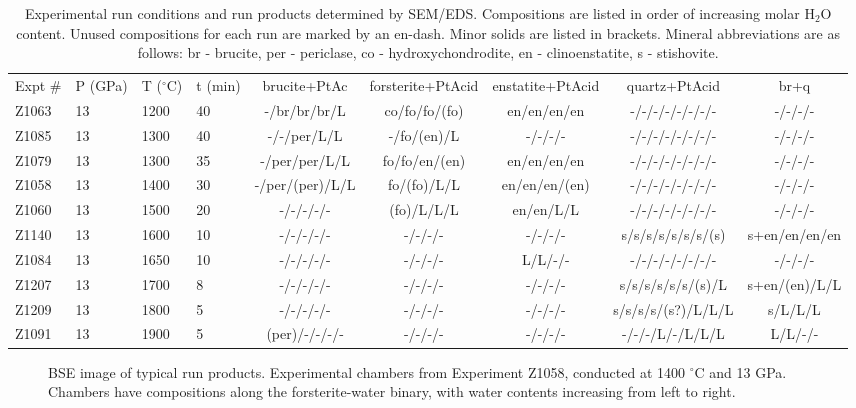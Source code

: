 \documentclass[review]{elsarticle}
\begin{document}
\begin{landscape}
\begin{table}[ht!]
\caption{Experimental run conditions and run products determined by SEM/EDS. Compositions are listed in order of increasing molar H$_2$O content. Unused compositions for each run are marked by an en-dash. Minor solids are listed in brackets. Mineral abbreviations are as follows: br - brucite, per - periclase, co - hydroxychondrodite, en - clinoenstatite, s - stishovite.}
\label{table:experiments}
\begin{tabular}{llllccccc}
Expt \# & P (GPa) & T ($^{\circ}$C) & t (min) & brucite+PtAc & forsterite+PtAcid & enstatite+PtAcid & quartz+PtAcid & br+q \\
Z1063 & 13 & 1200 & 40 & -/br/br/br/L & co/fo/fo/(fo) & en/en/en/en & -/-/-/-/-/-/-/- & -/-/-/- \\
Z1085 & 13 & 1300 & 40 & -/-/per/L/L & -/fo/(en)/L & -/-/-/- & -/-/-/-/-/-/-/- & -/-/-/- \\
Z1079 & 13 & 1300 & 35 & -/per/per/L/L & fo/fo/en/(en) & en/en/en/en & -/-/-/-/-/-/-/- & -/-/-/- \\
Z1058 & 13 & 1400 & 30 & -/per/(per)/L/L & fo/(fo)/L/L & en/en/en/(en) & -/-/-/-/-/-/-/- & -/-/-/- \\
Z1060 & 13 & 1500 & 20 & -/-/-/-/- & (fo)/L/L/L & en/en/L/L & -/-/-/-/-/-/-/- & -/-/-/- \\
Z1140 & 13 & 1600 & 10 & -/-/-/-/- & -/-/-/- & -/-/-/- & s/s/s/s/s/s/s/(s) & s+en/en/en/en \\
Z1084 & 13 & 1650 & 10 & -/-/-/-/- & -/-/-/- & L/L/-/- & -/-/-/-/-/-/-/- & -/-/-/- \\
Z1207 & 13 & 1700 & 8 & -/-/-/-/- & -/-/-/- & -/-/-/- & s/s/s/s/s/s/(s)/L & s+en/(en)/L/L \\
Z1209 & 13 & 1800 & 5 & -/-/-/-/- & -/-/-/- & -/-/-/- & s/s/s/s/(s?)/L/L/L & s/L/L/L \\
Z1091 & 13 & 1900 & 5 & (per)/-/-/-/- & -/-/-/- & -/-/-/- & -/-/-/L/-/L/L/L & L/L/-/-
\end{tabular}
\end{table}
\end{landscape}


\begin{figure}[ht!]
  \centering
  \caption{BSE image of typical run products. Experimental chambers from Experiment Z1058, conducted at 1400 $^{\circ}$C and 13 GPa. Chambers have compositions along the forsterite-water binary, with water contents increasing from left to right.}
  \label{fig:sem}
\end{figure}
\end{document}
